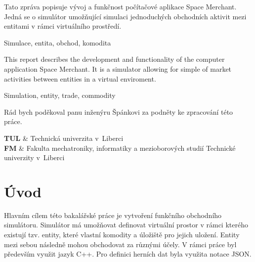 \documentclass[FM,BP]{tulthesis}
\begin{document}

\begin{abstractCZ}
Tato zpráva popisuje vývoj a funkčnost počítačové aplikace Space Merchant. Jedná se o simulátor umožňující simulaci jednoduchých obchodních aktivit mezi entitami v rámci virtuálního prostředí.
\end{abstractCZ}

\begin{keywordsCZ}
Simulace, entita, obchod, komodita
\end{keywordsCZ}

\vspace{2cm}

\begin{abstractEN}
This report describes the development and functionality of the computer application Space Merchant. It is a simulator allowing for simple of market activities between entities in a virtual enviroment.
\end{abstractEN}

\begin{keywordsEN}
Simulation, entity, trade, commodity
\end{keywordsEN}

\clearpage

\begin{acknowledgement}
Rád bych poděkoval panu inženýru Špánkovi za podněty ke zpracování této práce.
\end{acknowledgement}

\tableofcontents

\clearpage

\begin{abbrList}
\textbf{TUL} & Technická univerzita v~Liberci \\
\textbf{FM} & Fakulta mechatroniky, informatiky a mezioborových studií
Technické univerzity v~Liberci
\end{abbrList}


\chapter{Úvod}
Hlavním cílem této bakalářské práce je vytvoření funkčního obchodního simulátoru. Simulátor má umožňovat definovat virtuální prostor v rámci kterého existují tzv. entity, které vlastní komodity a úložiště pro jejich uložení. Entity mezi sebou následně mohou obchodovat za různými účely.
V rámci práce byl především využit jazyk C++. Pro definici herních dat byla využita notace JSON.
\end{document}
